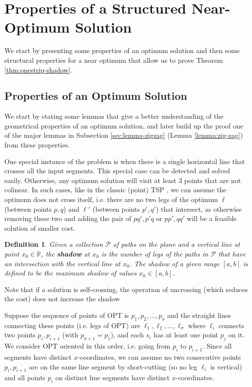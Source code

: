 \documentclass[pdflatex,sn-mathphys-num]{sn-jnl}
\theoremstyle{thmstyleone}
\newtheorem{definition}{Definition} %
\newtheorem{observation}{Observation} %
\newcommand{\RR}{\mathbb{R}}
\newcommand{\OPT}{{\text{OPT}}}
\begin{document}
\section{Properties of a Structured Near-Optimum Solution}\label{sec:properties}
We start by presenting some properties of an optimum solution and then some structural properties for a near 
optimum that allow us  to  prove Theorem \ref{thm:onestrip-shadow}.
\subsection{Properties of an Optimum Solution}\label{sec:opt-prop}

We start by stating some lemmas that give a better understanding of the geometrical properties of an optimum solution, and later build up the proof one of the major lemmas in Subsection \ref{sec:lemma-zigzag} 
(Lemma \ref{lemma:zig-zag}) from these properties.

One special instance of the problem is when there is a single horizontal line that crosses all the input segments.
This special case can be detected and solved easily. Otherwise, any optimum solution will visit at least
3 points that are not colinear. In such cases, like in the classic (point) TSP \cite{Arora98}, we can assume the optimum
does not cross itself, i.e. there are no two legs of the optimum $\ell$ (between points $p,q$) and $\ell'$ (between points $p',q'$) that intersect, as otherwise removing these two and adding the pair of $pq',p'q$ or $pp',qq'$ will be a feasible solution of smaller cost.

\begin{definition}\label{def:shadow}
    Given a collection $\mathcal  P$ of paths on the plane and a vertical line at point $x_0\in\RR$, the \textbf{shadow} at $x_0$ is the number of legs of the paths in $\mathcal  P$
    that have an intersection with the vertical line at $x_0$. The shadow of a given range $ [a, b] $ is defined to be the maximum shadow of values $ x_0 \in [a, b]$.
\end{definition}

Note that if a solution is self-crossing, the operation of uncrossing (which reduces the cost) does not increase the shadow

Suppose the sequence of points of $\OPT$ is $p_1,p_2,\ldots,p_\sigma$ and the straight lines connecting these points (i.e. legs of $\OPT$) are $\ell_1,\ell_2,\ldots,\ell_\sigma$
where $\ell_i$ connects two points $p_i,p_{i+1}$ (with $p_{\sigma+1}=p_1$), and each $s_i$ has at least one point $p_j$ on it. We consider $\OPT$ oriented in this order, i.e. going from $p_i$ to $p_{i+1}$. 
Since all segments have distinct $x$-coordinates, we can assume
	no two consecutive points $p_i,p_{i+1}$ are on the same line segment by short-cutting (so no leg $\ell_i$ is vertical) and all points $p_i$ on distinct line segments have distinct $x$-coordinates.
\end{document}
